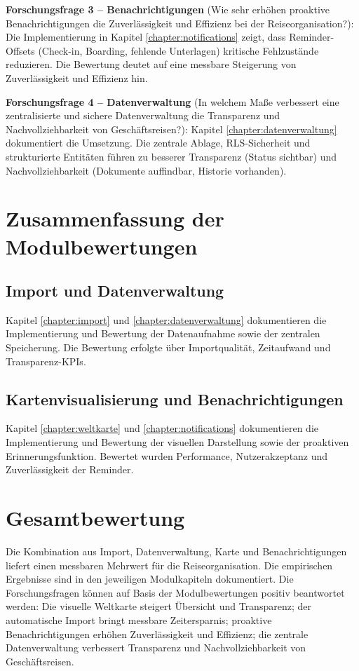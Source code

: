\textbf{Forschungsfrage 3 – Benachrichtigungen} (\glqq{}Wie sehr erhöhen proaktive
Benachrichtigungen die Zuverlässigkeit und Effizienz bei der Reiseorganisation?\grqq{}):
Die Implementierung in Kapitel \ref{chapter:notifications} zeigt, dass Reminder-Offsets
(Check-in, Boarding, fehlende Unterlagen) kritische Fehlzustände reduzieren. Die
Bewertung deutet auf eine messbare Steigerung von Zuverlässigkeit und Effizienz hin.

\textbf{Forschungsfrage 4 – Datenverwaltung} (\glqq{}In welchem Maße verbessert eine
zentralisierte und sichere Datenverwaltung die Transparenz und Nachvollziehbarkeit
von Geschäftsreisen?\grqq{}): Kapitel \ref{chapter:datenverwaltung} dokumentiert die
Umsetzung. Die zentrale Ablage, RLS-Sicherheit und strukturierte Entitäten führen
zu besserer Transparenz (Status sichtbar) und Nachvollziehbarkeit (Dokumente
auffindbar, Historie vorhanden).

\section{Zusammenfassung der Modulbewertungen}
\subsection{Import und Datenverwaltung}
Kapitel \ref{chapter:import} und \ref{chapter:datenverwaltung} dokumentieren die
Implementierung und Bewertung der Datenaufnahme sowie der zentralen Speicherung. Die Bewertung erfolgte über
Importqualität, Zeitaufwand und Transparenz-KPIs.

\subsection{Kartenvisualisierung und Benachrichtigungen}
Kapitel \ref{chapter:weltkarte} und \ref{chapter:notifications} dokumentieren die
Implementierung und Bewertung der visuellen Darstellung sowie der proaktiven Erinnerungsfunktion. Bewertet wurden
Performance, Nutzerakzeptanz und Zuverlässigkeit der Reminder.

\section{Gesamtbewertung}
Die Kombination aus Import, Datenverwaltung, Karte und Benachrichtigungen
liefert einen messbaren Mehrwert für die Reiseorganisation. Die empirischen
Ergebnisse sind in den jeweiligen Modulkapiteln dokumentiert. Die
Forschungsfragen können auf Basis der Modulbewertungen positiv beantwortet
werden: Die visuelle Weltkarte steigert Übersicht und Transparenz; der automatische
Import bringt messbare Zeitersparnis; proaktive Benachrichtigungen erhöhen
Zuverlässigkeit und Effizienz; die zentrale Datenverwaltung verbessert Transparenz
und Nachvollziehbarkeit von Geschäftsreisen.
